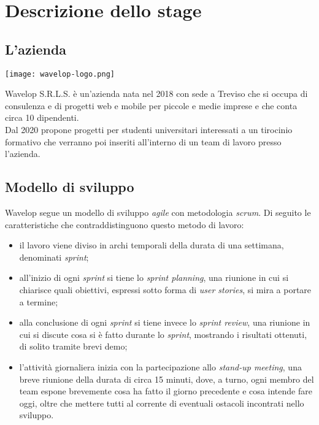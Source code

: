 \chapter{Descrizione dello stage}
\label{cap:azienda}

\section{L'azienda}

\begin{center}
	\texttt{[image: wavelop-logo.png]}
\end{center}

\noindent Wavelop S.R.L.S. è un'azienda nata nel 2018 con sede a Treviso che si occupa di consulenza e di progetti web e mobile per piccole e medie imprese e che conta circa 10 dipendenti.\\
Dal 2020 propone progetti per studenti universitari interessati a un tirocinio formativo che verranno poi  inseriti all'interno di un team di lavoro presso l'azienda.

\section{Modello di sviluppo}

Wavelop segue un modello di sviluppo \textit{agile} con metodologia \textit{scrum}. Di seguito le caratteristiche che contraddistinguono questo metodo di lavoro:

\begin{itemize}
  \item il lavoro viene diviso in archi temporali della durata di una settimana, denominati \textit{sprint};
  \item all'inizio di ogni \textit{sprint} si tiene lo \textit{sprint planning}, una riunione in cui si chiarisce quali obiettivi, espressi sotto forma di \textit{user stories}, si mira a portare a termine;
  \item alla conclusione di ogni \textit{sprint} si tiene invece lo \textit{sprint review}, una riunione in cui si discute cosa si è fatto durante lo \textit{sprint}, mostrando i risultati ottenuti, di solito tramite brevi demo;
  \item l'attività giornaliera inizia con la partecipazione allo \textit{stand-up meeting}, una breve riunione della durata di circa 15 minuti, dove, a turno, ogni membro del team espone brevemente cosa ha fatto il giorno precedente e cosa intende fare oggi, oltre che mettere tutti al corrente di eventuali ostacoli incontrati nello sviluppo.
\end{itemize}

